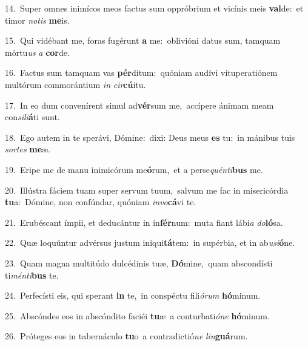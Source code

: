 {\numbfont\textcolor{\numbcolor}{14.}}~Super omnes inimícos meos factus sum oppróbrium et vicínis meis \textbf{val}\-de:~\star et timor \textit{no}\-\textit{tis} \textbf{me}\-is.\par
{\numbfont\textcolor{\numbcolor}{15.}}~Qui vidébant me, foras fugérunt \textbf{a} me:~\star oblivióni datus sum, tamquam mórtu\textit{us} \textit{a} \textbf{cor}\-de.\par
{\numbfont\textcolor{\numbcolor}{16.}}~Factus sum tamquam vas \textbf{pér}\-ditum:~\star quóniam audívi vituperatiónem multórum commorántium \textit{in} \textit{cir}\-\textbf{cú}itu.\par
{\numbfont\textcolor{\numbcolor}{17.}}~In eo dum convenírent simul ad\-\textbf{vér}\-sum me,~\star accípere ánimam meam con\-\textit{si}\-\textit{li}\textbf{á}ti sunt.\par
{\numbfont\textcolor{\numbcolor}{18.}}~Ego autem in te sperávi, Dómine:~\dagger dixi: Deus meus \textbf{es} tu:~\star in mánibus tuis \textit{sor}\-\textit{tes} \textbf{me}\-æ.\par
{\numbfont\textcolor{\numbcolor}{19.}}~Eripe me de manu inimicórum me\-\textbf{ó}\-rum,~\star et a perse\-\textit{quén}\-\textit{ti}\textbf{bus} me.\par
{\numbfont\textcolor{\numbcolor}{20.}}~Illústra fáciem tuam super servum tuum,~\dagger salvum me fac in misericórdia \textbf{tu}\-a:~\star Dómine, non confúndar, quóniam \textit{in}\-\textit{vo}\textbf{cá}vi te.\par
{\numbfont\textcolor{\numbcolor}{21.}}~Erubéscant ímpii, et deducántur in in\-\textbf{fér}\-num:~\star muta fiant lábi\textit{a} \textit{do}\-\textbf{ló}sa.\par
{\numbfont\textcolor{\numbcolor}{22.}}~Quæ loquúntur advérsus justum iniqui\-\textbf{tá}\-tem:~\star in supérbia, et in ab\-\textit{u}\-\textit{si}\textbf{ó}ne.\par
{\numbfont\textcolor{\numbcolor}{23.}}~Quam magna multitúdo dulcédinis tuæ, \textbf{Dó}\-mine,~\star quam abscondísti ti\-\textit{mén}\-\textit{ti}\textbf{bus} te.\par
{\numbfont\textcolor{\numbcolor}{24.}}~Perfecísti eis, qui sperant \textbf{in} te,~\star in conspéctu fili\-\textit{ó}\-\textit{rum} \textbf{hó}\-minum.\par
{\numbfont\textcolor{\numbcolor}{25.}}~Abscóndes eos in abscóndito faciéi \textbf{tu}\-æ~\star a conturbati\-\textit{ó}\-\textit{ne} \textbf{hó}\-minum.\par
{\numbfont\textcolor{\numbcolor}{26.}}~Próteges eos in tabernáculo \textbf{tu}\-o~\star a contradictió\textit{ne} \textit{lin}\-\textbf{guá}rum.\par
